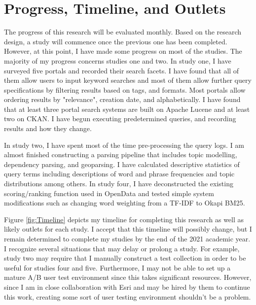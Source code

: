 \chapter{Progress, Timeline, and Outlets} \label{ch:[chapter 7 label]}

The progress of this research will be evaluated monthly. Based on the research design, a study will commence once the previous one has been completed. However, at this point, I have made some progress on most of the studies. The majority of my progress concerns studies one and two. In study one, I have surveyed five portals and recorded their search facets. I have found that all of them allow users to input keyword searches and most of them allow further query specifications by filtering results based on tags, and formats. Most portals allow ordering results by "relevance", creation date, and alphabetically. I have found that at least three portal search systems are built on Apache Lucene and at least two on CKAN. I have begun executing predetermined queries, and recording results and how they change.

In study two, I have spent most of the time pre-processing the query logs. I am almost finished constructing a parsing pipeline that includes topic modelling, dependency parsing, and geoparsing. I have calculated descriptive statistics of query terms including descriptions of word and phrase frequencies and topic distributions among others. In study four, I have deconstructed the existing scoring/ranking function used in OpenData and tested simple system modifications such as changing word weighting from a TF-IDF to Okapi BM25.



Figure \ref{fig:Timeline} depicts my timeline for completing this research as well as likely outlets for each study. I accept that this timeline will possibly change, but I remain determined to complete my studies by the end of the 2021 academic year. I recognize several situations that may delay or prolong a study. For example, study two may require that I manually construct a test collection in order to be useful for studies four and five. Furthermore, I may not be able to set up a mature A/B user test environment since this takes significant resources. However, since I am in close collaboration with Esri and may be hired by them to continue this work, creating some sort of user testing environment shouldn't be a problem.

